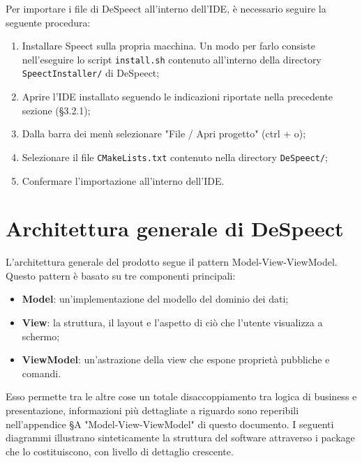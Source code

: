 \documentclass[openany,12pt,a4paper]{report}
\begin{document}
	Per importare i file di DeSpeect all'interno dell'IDE, è necessario seguire la seguente procedura:
	\begin{enumerate}
		\item Installare Speect sulla propria macchina. Un modo per farlo consiste nell'eseguire lo script \verb|install.sh| contenuto all'interno della directory \verb|SpeectInstaller/| di DeSpeect;
		\item Aprire l'IDE installato seguendo le indicazioni riportate nella precedente sezione (§3.2.1);
		\item Dalla barra dei menù selezionare "File / Apri progetto" (ctrl + o);
		\item Selezionare il file \verb|CMakeLists.txt| contenuto nella directory \verb|DeSpeect/|;
		\item Confermare l'importazione all'interno dell'IDE.
	\end{enumerate}
	

\chapter{Architettura generale di DeSpeect}

L'architettura generale del prodotto segue il pattern Model-View-ViewModel. Questo pattern è basato su tre componenti principali:

\begin{itemize}
	\item \textbf{Model}: un'implementazione del modello del dominio dei dati;
	\item \textbf{View}: la struttura, il layout e l'aspetto di ciò che l'utente visualizza a schermo;
	\item \textbf{ViewModel}: un'astrazione della view che espone proprietà pubbliche e comandi.
\end{itemize}

\noindent Esso permette tra le altre cose un totale disaccoppiamento tra logica di business e presentazione, informazioni più dettagliate a riguardo sono reperibili nell'appendice §A "Model-View-ViewModel" di questo documento. I seguenti diagrammi illustrano sinteticamente la struttura del software attraverso i package che lo costituiscono, con livello di dettaglio crescente.
\newpage
\end{document}

